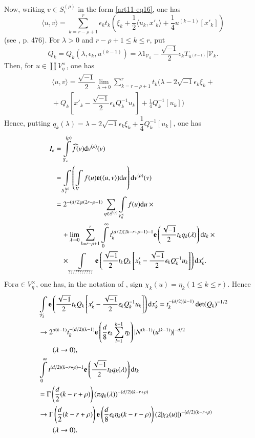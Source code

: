 Now, writing $v\in S^{(\rho)}_{\epsilon}$ in the form \eqref{art11-eq16}, one has
$$
\langle u,v\rangle = \sum\limits^{r}_{k=r-\rho+1}\epsilon_{k}t_{k}\left(\xi_{k}+\frac{1}{2}\langle u_{k},x'_{k}\rangle+\frac{1}{4}u^{(k-1)}[x'_{k}]\right)
$$
(see \cite{art11-keySF}, p. 476). For $\lambda > 0$ and $r-\rho+1\leq k\leq r$, put
$$
Q_{k}=Q_{k}(\lambda,\epsilon_{k},u^{(k-1)})=\lambda 1_{\mathscr{V}_{k}}-\dfrac{\sqrt{-1}}{2}\epsilon_{k}T_{u^{(k-1)}}|\mathscr{V}_{k}.
$$
Then, for $u\in \coprod V^{\times}_{\eta}$, one has 
\begin{multline*}
\langle u,v\rangle =\dfrac{\sqrt{-1}}{2}\lim\limits_{\lambda\to 0}\sum\limits^{r}_{k=r-\rho+1}t_{k}(\lambda-2\sqrt{-1}\epsilon_{k}\xi_{k}+{}\\
{}+ Q_{k}\left[x'_{k}-\dfrac{\sqrt{-1}}{2}\epsilon_{k}Q_{k}^{-1}u_{k}\right]+\frac{1}{4}Q_{k}^{-1}[u_{k}])
\end{multline*}
Hence, putting $q_{k}(\lambda)=\lambda-2\sqrt{-1}\epsilon_{k}\xi_{k}+\dfrac{1}{4}Q_{k}^{-1}[u_{k}]$, one has
\begin{align*}
I_{\epsilon} &= \int\limits_{S_{\epsilon}}^{(\rho)}\widehat{f}(v)\mathrm{d} v^{(\rho)}(v)\\
&= \int\limits_{S_{\epsilon}^{(\rho)}}\left(\int\limits_{V}f(u)\mathbf{e}(\langle u, v\rangle)\mathrm{d} u\right)\mathrm{d} v^{(\rho)}(v)\\
&= 2^{-(d/2)\rho(2r-\rho-1)}\sum\limits_{\eta\in \mathscr{E}^{(r)}}\int\limits_{V^{\times}_{\eta}}f(u)\mathrm{d} u\times {}\\
&\quad +\lim\limits_{\lambda\to 0}\sum\limits^{r}_{k=r-\rho+1}\int\limits^{\infty}_{0}t_{k}^{(d/2)(2k-r+\rho-1)-1}\mathbf{e}\left(\frac{\sqrt{-1}}{2}t_{k}q_{k}(\lambda)\right)\mathrm{d} t_{k}\times{}\\
&\quad {}\times \int\limits_{???????????}\mathbf{e}\left(\dfrac{\sqrt{-1}}{2}t_{k}Q_{k}\left[x'_{k}-\dfrac{\sqrt{-1}}{2}\epsilon_{k}Q_{k}^{-1}u_{k}\right]\right)\mathrm{d} x'_{k}.
\end{align*}
For\pageoriginale $u\in V^{\times}_{\eta}$, one has, in the notation of \cite{art11-keySF}, sign $\chi_{k}(u)=\eta_{k}(1\leq k\leq r)$. Hence
\begin{align*}
& \int\limits_{\mathscr{V}_{k}}\mathbf{e} \left(\dfrac{\sqrt{-1}}{2}t_{k}Q_{k}\left[x'_{k}-\dfrac{\sqrt{-1}}{2}\epsilon_{k}Q_{k}^{-1}u_{k}\right]\right)\mathrm{d} x'_{k}=t_{k}^{-(d/2)(k-1)}\det (Q_{k})^{-1/2}\\
&\to 2^{d(k-1)}t_{k}^{-(d/2)(k-1)}\mathbf{e} \left(\dfrac{d}{8}\epsilon_{k}\sum\limits^{k-1}_{l=1}\eta_{l}\right) | N^{(k-1)}(u^{(k-1)}) |^{-d/2}\\
&\tag*{$(\lambda\to 0)$,}\\
&\int\limits^{\infty}_{0}t^{(d/2)(k-r+\rho)-1}\mathbf{e}\left(\dfrac{\sqrt{-1}}{2}t_{k}q_{k}(\lambda)\right)\mathrm{d} t_{k}\\
&=\Gamma\left(\dfrac{d}{2}(k-r+\rho)\right)(\pi q_{k}(\lambda))^{-(d/2)(k-r+\rho)}\\
&\to \Gamma\left(\dfrac{d}{2}(k-r+\rho)\right)\mathbf{e}\left(\dfrac{d}{8}\epsilon_{k}\eta_{k}(k-r-\rho)\right)(2|\chi_{k}(u)|)^{-(d/2)(k-r+\rho)}\\
&\tag*{$(\lambda\to 0).$}
\end{align*}
